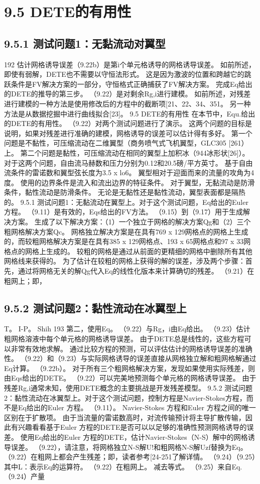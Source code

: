 \documentclass[UTF8,11pt,a4paper,openany,fontset=fandol]{ctexbook}
\begin{document}
\section{9.5 DETE的有用性}
\subsection{9.5.1 测试问题1：无黏流动对翼型}
192 估计网格诱导误差（9.22b）是第i个单元格诱导的网格诱导误差。 如前所述，即使有弱解，DETE也不需要以守恒法形式。 这是因为激波的位置和跨越它的跳跃条件是FV解决方案的一部分，守恒格式正确捕获了FV解决方案。 完成Eq给出的DETE的推导的第三步。 （9.22）是对剩余Rg,i进行建模。 如前所述，对残差进行建模的一种方法是使用修改后的方程中的截断项[21、22、34、351。 另一种方法是从数据挖掘中进行曲线拟合[23]。 9.5 DETE的有用性 在本节中，Equ.给出的DETE的有用性。 （9.22）对两个测试问题进行了演示。 这两个问题的目标是说明，如果对残差进行准确的建模，网格诱导的误差可以估计得有多好。 第一个问题是不黏性，可压缩流动在二维翼型（商务喷气式飞机翼型，GLC305 [261）上。 第二个问题是黏性，可压缩流动在相同的翼型上加积冰（944冰形状[26]）。 对于这两个问题，自由流马赫数和压力分别为0.12和20.5磅/平方英寸。 基于自由流条件的雷诺数和翼型弦长度为3.5 x lo6。 翼型相对于迎面而来的流量的攻角为4度。 使用的边界条件是流入和流出边界的特征条件。 对于翼型，无黏流动是防滑条件，黏性流动是防滑条件。 无论是无黏性还是黏性流动，翼型表面都是隔热的。 9.5.1 测试问题1：无黏流动在翼型上。对于这个测试问题，Eq给出的Euler 方程。 （9.11）是有效的，Eqs给出的FV方法。 （9.15）到（9.17）用于生成解决方案。 生成了以下解决方案：（1）一个独立于网格的解决方案Qg和（2）三个粗网格解决方案Qc。 网格独立解决方案是在具有769 x 129网格点的网格上生成的，而较粗网格解决方案是在具有385 x 129网格点、193 x 65网格点和97 x 33网格点的网格上生成的。 较粗的网格是通过从前面的更精细的网格中删除所有其他网格线来获得的。 为了估计在较粗的网格上获得的解的误差，涉及两个步骤：首先，通过将网格无关的解Qg代入Eq的线性化版本来计算确切的残差。 （9.21）在粗网上；即，

\subsection{9.5.2 测试问题2：黏性流动在冰翼型上}
T。 I-P。 Shih 193 第二，使用Eq。 （9.22）与Rg，i由Eq给出。 （9.23）估计粗网格溶液中每个单元格的网格诱导误差。 由于DETE总是线性的，这些方程可以非常有效地求解。 通过比较方程的预测，可以评估估计的网格诱导误差的准确性。 （9.22）和（9.23）与实际网格诱导的误差直接从网格独立解和粗网格解通过Eq计算。 （9.22b）。 对于所有三个粗网格解决方案，发现如果使用实际残差，则由Eqs给出的DETE。 （9.22）可以完美地预测每个单元格的网格诱导误差。 由于残差Rg,i通常未知，使用DETE概念的主要挑战是开发残差模型。 9.5.2 测试问题2：黏性流动在冰翼型上。对于这个测试问题，控制方程是Navier-Stokes方程，而不是Eq给出的Euler 方程。 （9.11）。 Navier-Stokes 方程和Euler 方程之间的唯一区别在于扩散项。 由于当流量的雷诺数高时，对流传输预计将主导扩散传输，因此有兴趣看看基于Euler 方程的DETE是否可以以足够的准确性预测网格诱导的误差。 使用Eq给出的Euler 方程的DETE，估计Navier-Stokes（N-S）解中的网格诱导误差。 （9.22），请注意，将网格独立N-S解U!和粗网格N-S解Uzf替换为Eq。 （9.22）在粗网上都会产生残差；即，读者参考[24-251了解详情。 （9.24）（9.25）其中L：表示Eq的运算符。 （9.22）在粗网上。 减去等式。 （9.25）来自Eq. （9.24）产量
\end{document}
